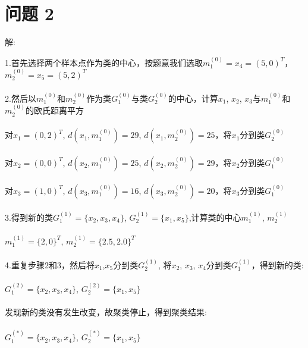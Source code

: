 \documentclass[]{article}
\begin{document}
\section{问题 2}
\begin{flushleft}
解:
\end{flushleft}
1.首先选择两个样本点作为类的中心，按题意我们选取$m_1^{(0)}=x_4=(5,0)^T$，$m_2^{(0)}=x_5=(5,2)^T$\\\\
2.然后以$m_1^{(0)}$和$m_2^{(0)}$作为类$G_1^{(0)}$与类$G_2^{(0)}$的中心，计算$x_1$, $x_2$, $x_3$与$m_1^{(0)}$和$m_2^{(0)}$的欧氏距离平方\\\\
对$x_1=(0,2)^T$, $d(x_1,m_1^{(0)})=29$, $d(x_1,m_2^{(0)})=25$，将$x_1$分到类$G_2^{(0)}$\\\\
对$x_2=(0,0)^T$, $d(x_2,m_1^{(0)})=25$, $d(x_2,m_2^{(0)})=29$，将$x_2$分到类$G_1^{(0)}$\\\\
对$x_3=(1,0)^T$, $d(x_3,m_1^{(0)})=16$, $d(x_3,m_2^{(0)})=20$，将$x_3$分到类$G_1^{(0)}$\\\\
3.得到新的类$G_1^{(1)}=\{x_2,x_3,x_4\}$, $G_2^{(1)}=\{x_1,x_5\}$,计算类的中心$m_1^{(1)}$, $m_2^{(1)}$\\\\
$m_1^{(1)}=\{2,0\}^T$, $m_2^{(1)}=\{2.5,2.0\}^T$\\\\
4.重复步骤2和3，然后将$x_1$,$x_5$分到类$G_2^{(1)}$, 将$x_2$, $x_3$, $x_4$分到类$G_1^{(1)}$，得到新的类:\\\\
$G_1^{(2)}=\{x_2,x_3,x_4\}$, $G_2^{(2)}=\{x_1,x_5\}$\\\\
发现新的类没有发生改变，故聚类停止，得到聚类结果:\\\\
$G_1^{(*)}=\{x_2,x_3,x_4\}$, $G_2^{(*)}=\{x_1,x_5\}$
\end{document}
